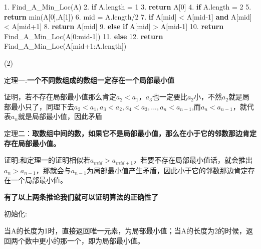 \documentclass[
]{ctexart}
\newenvironment{Shaded}{}{}
\newcommand{\BuiltInTok}[1]{#1}
\newcommand{\ControlFlowTok}[1]{\textcolor[rgb]{0.00,0.44,0.13}{\textbf{#1}}}
\newcommand{\DecValTok}[1]{\textcolor[rgb]{0.25,0.63,0.44}{#1}}
\newcommand{\FloatTok}[1]{\textcolor[rgb]{0.25,0.63,0.44}{#1}}
\newcommand{\KeywordTok}[1]{\textcolor[rgb]{0.00,0.44,0.13}{\textbf{#1}}}
\newcommand{\NormalTok}[1]{#1}
\newcommand{\OperatorTok}[1]{\textcolor[rgb]{0.40,0.40,0.40}{#1}}
\begin{document}
\begin{Shaded}
\begin{Highlighting}[]
\FloatTok{1.}\NormalTok{ Find\_A\_Min\_Loc(A)}
\FloatTok{2.}   \ControlFlowTok{if}\NormalTok{ A.length }\OperatorTok{=} \DecValTok{1}
\FloatTok{3.}     \ControlFlowTok{return}\NormalTok{ A[}\DecValTok{0}\NormalTok{]}
\FloatTok{4.}   \ControlFlowTok{if}\NormalTok{ A.length }\OperatorTok{=} \DecValTok{2}
\FloatTok{5.}     \ControlFlowTok{return} \BuiltInTok{min}\NormalTok{(A[}\DecValTok{0}\NormalTok{],A[}\DecValTok{1}\NormalTok{])}
\FloatTok{6.}\NormalTok{   mid }\OperatorTok{=}\NormalTok{ A.length}\OperatorTok{/}\DecValTok{2}
\FloatTok{7.}   \ControlFlowTok{if}\NormalTok{ A[mid] }\OperatorTok{\textless{}}\NormalTok{ A[mid}\OperatorTok{{-}}\DecValTok{1}\NormalTok{] }\KeywordTok{and}\NormalTok{ A[mid] }\OperatorTok{\textless{}}\NormalTok{ A[mid}\OperatorTok{+}\DecValTok{1}\NormalTok{]}
\FloatTok{8.}   	\ControlFlowTok{return}\NormalTok{ A[mid]}
\FloatTok{9.}   \ControlFlowTok{else} \ControlFlowTok{if}\NormalTok{ A[mid] }\OperatorTok{\textgreater{}}\NormalTok{ A[mid}\OperatorTok{{-}}\DecValTok{1}\NormalTok{]}
\FloatTok{10.}  	\ControlFlowTok{return}\NormalTok{ Find\_A\_Min\_Loc(A[}\DecValTok{0}\NormalTok{:mid}\OperatorTok{{-}}\DecValTok{1}\NormalTok{])}
\FloatTok{11.}  \ControlFlowTok{else}
\FloatTok{12.}  	\ControlFlowTok{return}\NormalTok{ Find\_A\_Min\_Loc(A[mid}\OperatorTok{+}\DecValTok{1}\NormalTok{:A.length])   }
\end{Highlighting}
\end{Shaded}

(2)

定理一:\textbf{一个不同数组成的数组一定存在一个局部最小值}

证明，若不存在局部最小值那么肯定\(a_2<a_1\)，\(a_3\)也一定要比\(a_2\)小，不然\(a_2\)就是局部最小只了，同理下去\(a_2<a_1,a_3<a_2,a_4<a_3,...,a_n<a_{n-1}\),而\(a_n<a_{n-1}\)，就代表\(a_n\)就是局部最小值，因此矛盾

定理二：\textbf{取数组中间的数，如果它不是局部最小值，那么在小于它的邻数那边肯定存在局部最小值。}

证明:和定理一的证明相似若\(a_{mid}>a_{mid+1}\)，若要不存在局部最小值话，就会推出\(a_n>a_{n-1}\)，那就会与\(a_{n-1}\)为局部最小值产生矛盾，因此小于它的邻数那边肯定存在一个局部最小值。

\textbf{有了以上两条推论我们就可以证明算法的正确性了}

初始化:

当A的长度为1时，直接返回唯一元素，为局部最小值；当A的长度为2的时候，返回两个数中更小的那一个，即为局部最小值。
\end{document}
